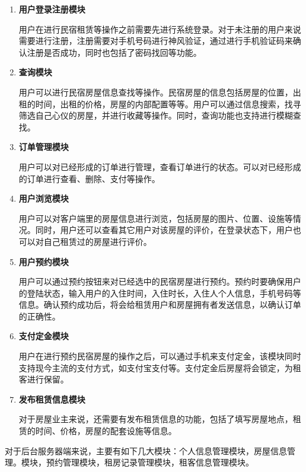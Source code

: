 \documentclass[lang=cn,11pt,a4paper,cite=authoryear]{elegantpaper}
\begin{document}
\begin{enumerate}
    \def\labelenumi{\arabic{enumi}.}
    \item
          \textbf{用户登录注册模块}

          用户在进行民宿租赁等操作之前需要先进行系统登录。对于未注册的用户来说需要进行注册，注册需要对手机号码进行神风验证，通过进行手机验证码来确认注册是否成功，同时也包括了密码找回等功能。
    \item
          \textbf{查询模块}

          用户可以进行民宿房屋信息查找等操作。民宿房屋的信息包括房屋的位置，出租的时间，出租的价格，房屋的内部配置等等。用户可以通过信息搜索，找寻筛选自己心仪的房屋，并进行收藏等操作。同时，查询功能也支持进行模糊查找。
    \item
          \textbf{订单管理模块}

          用户可以对已经形成的订单进行管理，查看订单进行的状态。可以对已经形成的订单进行查看、删除、支付等操作。
    \item
          \textbf{用户浏览模块}

          用户可以对客户端里的房屋信息进行浏览，包括房屋的图片、位置、设施等情况。同时，用户还可以查看其它用户对该房屋的评价，在登录状态下，用户也可以对自己租赁过的房屋进行评价。
    \item
          \textbf{用户预约模块}

          用户可以通过预约按钮来对已经选中的民宿房屋进行预约。预约时要确保用户的登陆状态，输入用户的入住时间，入住时长，入住人个人信息，手机号码等信息。确认预约成功后，将会给租赁用户和房屋拥有者发送信息，以确认订单的正确性。
    \item
          \textbf{支付定金模块}

          用户在进行预约民宿房屋的操作之后，可以通过手机来支付定金，该模块同时支持现今主流的支付方式，如支付宝支付等。支付定金后房屋将会锁定，为租客进行保留。
    \item
          \textbf{发布租赁信息模块}

          对于房屋业主来说，还需要有发布租赁信息的功能，包括了填写房屋地点，租赁的时间、价格，房屋的配套设施等信息。
\end{enumerate}

对于后台服务器端来说，主要有如下几大模块：个人信息管理模块，房屋信息管理。模块，预约管理模块，租房记录管理模块，租客信息管理模块。
\end{document}
